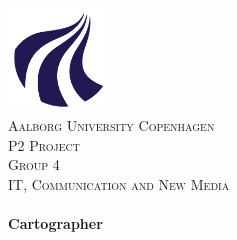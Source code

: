 \begin{titlepage}
	 
	\center
	 
		
	\includegraphics[width=0.2\textwidth]{pics/AAU_Logo.png}\\[1cm]
		 
		
	\textsc{\LARGE Aalborg University Copenhagen}\\[1.5cm]
		
	\textsc{\Large P2 Project}\\[0.5cm]
		
	\textsc{\large Group 4}\\[0.5cm]
		
	\textsc{\large IT, Communication and New Media}\\[0.5cm]
		
		
		
	\HRule\\[0.4cm]
		
	{\huge\bfseries Cartographer}\\[0.4cm]
	
	\HRule\\[0.4cm]
		
		
		

\end{titlepage}
